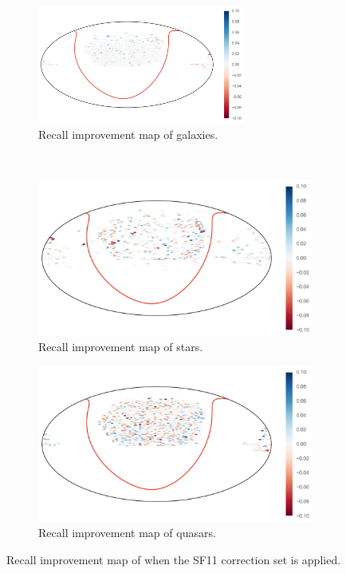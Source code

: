 \begin{figure}[p]
	\centering
	\begin{subfigure}{\textwidth}
		\centering
		\includegraphics[width=0.75\textwidth]{figures/appendix/map_recall_sf11_Galaxy}
		\caption{Recall improvement map of galaxies.}
		\label{fig:map_recall_sf11_galaxies}
	\end{subfigure}\\
	\begin{subfigure}{\textwidth}
		\centering
		\includegraphics[width=0.75\linewidth]{figures/appendix/map_recall_sf11_Star}
		\caption{Recall improvement map of stars.}
		\label{fig:map_recall_sf11_stars}
	\end{subfigure}
	\begin{subfigure}{\textwidth}
		\centering
		\includegraphics[width=0.75\linewidth]{figures/appendix/map_recall_sf11_Quasar}
		\caption{Recall improvement map of quasars.}
		\label{fig:map_recall_sf11_quasars}
	\end{subfigure}
	\caption{Recall improvement map of when the SF11 correction set is applied.}
	\label{fig:map_recall_sf11}
\end{figure}


